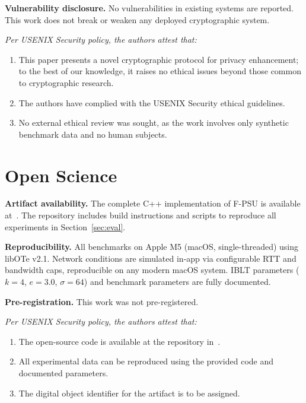 \documentclass[letterpaper,twocolumn,10pt]{article}
\theoremstyle{definition}
\begin{document}
\textbf{Vulnerability disclosure.} No vulnerabilities in existing systems are
reported. This work does not break or weaken any deployed cryptographic system.

\smallskip
\noindent\textit{Per USENIX Security policy, the authors attest that:}
\begin{enumerate}
\item This paper presents a novel cryptographic protocol for privacy
enhancement; to the best of our knowledge, it raises no ethical issues beyond
those common to cryptographic research.
\item The authors have complied with the USENIX Security ethical guidelines.
\item No external ethical review was sought, as the work involves only
synthetic benchmark data and no human subjects.
\end{enumerate}

\section{Open Science}

\textbf{Artifact availability.} The complete C++ implementation of F-PSU is
available at~\cite{code}. The repository includes build instructions and
scripts to reproduce all experiments in Section~\ref{sec:eval}.

\textbf{Reproducibility.} All benchmarks on Apple M5 (macOS, single-threaded)
using libOTe v2.1. Network conditions are simulated in-app via configurable
RTT and bandwidth caps, reproducible on any modern macOS system. IBLT
parameters ($k = 4$, $e = 3.0$, $\sigma = 64$) and benchmark parameters are
fully documented.

\textbf{Pre-registration.} This work was not pre-registered.

\smallskip
\noindent\textit{Per USENIX Security policy, the authors attest that:}
\begin{enumerate}
\item The open-source code is available at the repository in~\cite{code}.
\item All experimental data can be reproduced using the provided code and
documented parameters.
\item The digital object identifier for the artifact is to be assigned.
\end{enumerate}
\end{document}
